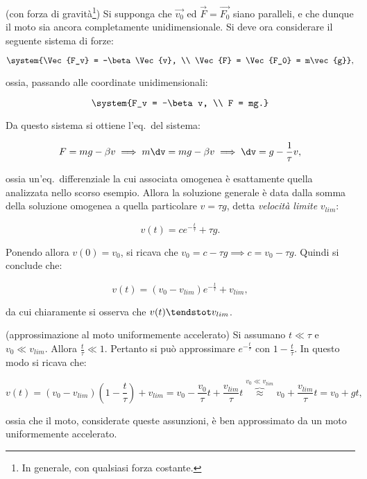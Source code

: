 \documentclass[11pt]{article}
\begin{document}
	\begin{example} (con forza di gravità\footnote{In generale,
			con qualsiasi forza costante.}) Si supponga che $\Vec{v_0}$
		ed $\Vec{F} = \Vec{F_0}$ siano paralleli, e che dunque il
		moto sia ancora completamente unidimensionale. 
		Si deve ora considerare il seguente sistema di forze:
		
		\[ \system{\Vec{F_v} = -\beta \Vec{v}, \\ \Vec{F} = \Vec{F_0} = m\vec{g}}, \]
		
		ossia, passando alle coordinate unidimensionali:
		
		\[ \system{F_v = -\beta v, \\ F = mg.} \]
		
		Da questo sistema si ottiene l'eq.~del sistema:
		
		\vskip 0.1in
		
		\[ F = mg - \beta v \implies m \dv = mg - \beta v \implies \dv = g - \frac{1}{\tau} v, \]
		
		ossia un'eq.~differenziale la cui associata omogenea è
		esattamente quella analizzata nello scorso esempio. Allora
		la soluzione generale è data dalla somma della soluzione
		omogenea a quella particolare $v = \tau g$, detta
		\textit{velocità limite} $v_{lim}$:
		
		\[ v(t) = c e^{-\frac{t}{\tau}} + \tau g. \]
		
		Ponendo allora $v(0) = v_0$, si ricava che $v_0 = c - \tau g \implies c = v_0 - \tau g$. Quindi si conclude che:
		
		\[ v(t) = (v_0 - v_{lim}) e^{-\frac{t}{\tau}} + v_{lim}, \]
		
		da cui chiaramente si osserva che $v(t) \tendstot v_{lim}$.
		
	\end{example}
	
	\begin{example} (approssimazione al moto uniformemente accelerato)
		Si assumano $t \ll \tau$ e $v_0 \ll v_{lim}$. Allora
		$\frac{t}{\tau} \ll 1$. Pertanto si può approssimare
		$e^{-\frac{t}{\tau}}$ con $1 - \frac{t}{\tau}$.
		In questo modo si ricava che:
		
		\[ v(t) = (v_0 - v_{lim})(1 - \frac{t}{\tau}) + v_{lim} =
		v_0 - \frac{v_0}{\tau}t + \frac{v_{lim}}{\tau} t
		\overbrace{\approx}^{v_0 \ll v_{lim}} v_0 + \frac{v_{lim}}{\tau} t = v_0 + gt,\]
		
		ossia che il moto, considerate queste assunzioni, è ben approssimato
		da un moto uniformemente accelerato.
	\end{example}
	
\end{document}
